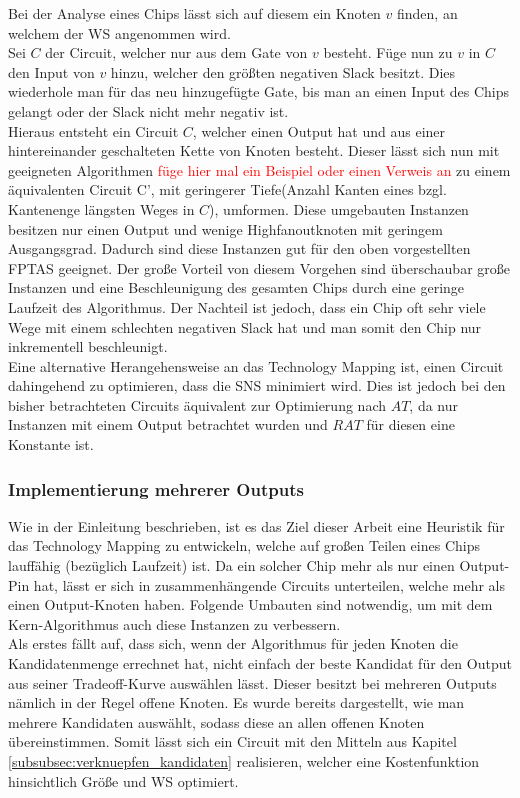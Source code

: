 \documentclass[11pt, a4paper, german]{article}
\newcommand{\TM}{Technology  Mapping }
\begin{document}
Bei der Analyse eines Chips lässt sich auf diesem ein Knoten $v$ finden, an welchem der WS angenommen wird.\\
Sei $C$ der Circuit, welcher nur aus dem Gate von $v$ besteht. Füge nun zu $v$ in $C$ den Input von $v$ hinzu, welcher den größten negativen Slack besitzt. Dies wiederhole man für das neu hinzugefügte Gate, bis man an einen Input des Chips gelangt oder der Slack nicht mehr negativ ist. \\
Hieraus entsteht ein Circuit $C$, welcher einen Output hat und aus einer hintereinander geschalteten Kette von Knoten besteht. Dieser lässt sich nun mit geeigneten Algorithmen \textcolor{red}{füge hier mal ein Beispiel oder einen Verweis an} zu einem äquivalenten Circuit C', mit geringerer Tiefe(Anzahl Kanten eines bzgl. Kantenenge längsten  Weges in $C$), umformen. Diese umgebauten Instanzen besitzen nur einen Output und wenige Highfanoutknoten mit geringem Ausgangsgrad. Dadurch sind diese Instanzen gut für den oben vorgestellten FPTAS geeignet. Der große Vorteil von diesem Vorgehen sind überschaubar große Instanzen und eine Beschleunigung des gesamten Chips durch eine geringe Laufzeit des Algorithmus. Der Nachteil ist jedoch, dass ein Chip oft sehr viele Wege mit einem schlechten negativen Slack hat und man somit den Chip nur inkrementell beschleunigt.\\

Eine alternative Herangehensweise an das \TM ist, einen Circuit dahingehend zu optimieren, dass die SNS minimiert wird. Dies ist jedoch bei den bisher betrachteten Circuits äquivalent zur Optimierung nach $AT$, da nur Instanzen mit einem Output betrachtet wurden und $RAT$ für diesen eine Konstante ist.

\subsubsection{Implementierung mehrerer Outputs}
\label{subsec:mehrere_outputs}
Wie in der Einleitung beschrieben, ist es das Ziel dieser Arbeit eine Heuristik für das \TM zu entwickeln, welche auf großen Teilen eines Chips lauffähig (bezüglich Laufzeit) ist. Da ein solcher Chip mehr als nur einen Output-Pin hat, lässt er sich in zusammenhängende Circuits unterteilen, welche mehr als einen Output-Knoten haben. Folgende Umbauten sind notwendig, um mit dem Kern-Algorithmus auch diese Instanzen zu verbessern.\\

Als erstes fällt auf, dass sich, wenn der Algorithmus für jeden Knoten die Kandidatenmenge errechnet hat, nicht einfach der beste Kandidat für den Output aus seiner Tradeoff-Kurve auswählen lässt. Dieser besitzt bei mehreren Outputs nämlich in der Regel offene Knoten. 
Es wurde bereits dargestellt, wie man mehrere Kandidaten auswählt, sodass diese an allen offenen Knoten übereinstimmen. Somit lässt sich ein Circuit mit den Mitteln aus Kapitel \ref{subsubsec:verknuepfen_kandidaten} realisieren, welcher eine Kostenfunktion hinsichtlich Größe und WS optimiert. \\
\end{document}
